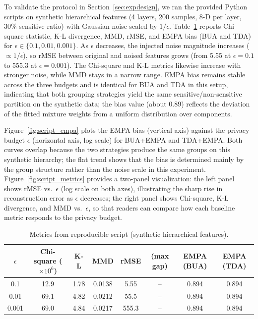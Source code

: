 \documentclass[journal,transmag]{IEEEtran}
\begin{document}
To validate the protocol in Section~\ref{sec:expdesign}, we ran the provided Python scripts on synthetic hierarchical features (4 layers, 200 samples, 8-D per layer, 30\% sensitive ratio) with Gaussian noise scaled by $1/\epsilon$. Table~\ref{tab:script} reports Chi-square statistic, K-L divergence, MMD, rMSE, and EMPA bias (BUA and TDA) for $\epsilon \in \{0.1, 0.01, 0.001\}$. As $\epsilon$ decreases, the injected noise magnitude increases ($\propto 1/\epsilon$), so rMSE between original and noised features grows (from 5.55 at $\epsilon=0.1$ to 555.3 at $\epsilon=0.001$). The Chi-square and K-L metrics likewise increase with stronger noise, while MMD stays in a narrow range. EMPA bias remains stable across the three budgets and is identical for BUA and TDA in this setup, indicating that both grouping strategies yield the same sensitive/non-sensitive partition on the synthetic data; the bias value (about 0.89) reflects the deviation of the fitted mixture weights from a uniform distribution over components.

Figure~\ref{fig:script_empa} plots the EMPA bias (vertical axis) against the privacy budget $\epsilon$ (horizontal axis, log scale) for BUA+EMPA and TDA+EMPA. Both curves overlap because the two strategies produce the same groups on this synthetic hierarchy; the flat trend shows that the bias is determined mainly by the group structure rather than the noise scale in this experiment. Figure~\ref{fig:script_metrics} provides a two-panel visualization: the left panel shows rMSE vs.\ $\epsilon$ (log scale on both axes), illustrating the sharp rise in reconstruction error as $\epsilon$ decreases; the right panel shows Chi-square, K-L divergence, and MMD vs.\ $\epsilon$, so that readers can compare how each baseline metric responds to the privacy budget.

\begin{table}[t]
\centering
\caption{Metrics from reproducible script (synthetic hierarchical features).}
\label{tab:script}
\begin{tabular}{c|ccccc|cc}
\hline
$\epsilon$ & Chi-square ($\times 10^6$) & K-L & MMD & rMSE & (max gap) & EMPA (BUA) & EMPA (TDA) \\
\hline
0.1  & 12.9 & 1.78 & 0.0138 & 5.55 & -- & 0.894 & 0.894 \\
0.01 & 69.1 & 4.82 & 0.0212 & 55.5 & -- & 0.894 & 0.894 \\
0.001& 69.0 & 4.84 & 0.0217 & 555.3 & -- & 0.894 & 0.894 \\
\hline
\end{tabular}
\end{table}
\end{document}
